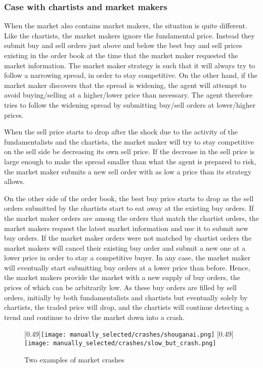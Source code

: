\subsubsection*{Case with chartists and market makers}
When the market also contains market makers, the situation is quite different. Like the chartists, the market makers ignore the fundamental price. Instead they submit buy and sell orders just above and below the best buy and sell prices existing in the order book at the time that the market maker requested the market information. The market maker strategy is such that it will always try to follow a narrowing spread, in order to stay competitive. On the other hand, if the market maker discovers that the spread is widening, the agent will attempt to avoid buying/selling at a higher/lower price than necessary. The agent therefore tries to follow the widening spread by submitting buy/sell orders at lower/higher prices.

When the sell price starts to drop after the shock due to the activity of the fundamentalists and the chartists, the market maker will try to stay competitive on the sell side be decreasing its own sell price. If the decrease in the sell price is large enough to make the spread smaller than what the agent is prepared to risk, the market maker submits a new sell order with as low a price than its strategy allows.

On the other side of the order book, the best buy price starts to drop as the sell orders submitted by the chartists start to eat away at the existing buy orders. If the market maker orders are among the orders that match the chartist orders, the market makers request the latest market information and use it to submit new buy orders. If the market maker orders were not matched by chartist orders the market makers will cancel their existing buy order and submit a new one at a lower price in order to stay a competitive buyer. In any case, the market maker will eventually start submitting buy orders at a lower price than before. Hence, the market makers provide the market with a new supply of buy orders, the prices of which can be arbitrarily low. As these buy orders are filled by sell orders, initially by both fundamentalists and chartists but eventually solely by chartists, the traded price will drop, and the chartists will continue detecting a trend and continue to drive the market down into a crash.

\begin{figure}
     \centering
     \subcaptionbox{}
     [0.49\linewidth]{\texttt{[image: manually\_selected/crashes/shouganai.png]}}
	\subcaptionbox{}
     [0.49\linewidth]{\texttt{[image: manually\_selected/crashes/slow\_but\_crash.png]}}  
     \caption{Two examples of market crashes}
     \label{}
\end{figure}

